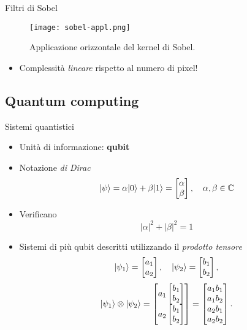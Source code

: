\begin{frame}{Filtri di Sobel}
	\begin{figure}
		\begin{center}
			\texttt{[image: sobel-appl.png]}
		\end{center}
		\caption{Applicazione orizzontale del kernel di Sobel.}\label{fig:sobel-appl}
	\end{figure}

	\begin{itemize}
		\item Complessità \emph{lineare} rispetto al numero di pixel!
	\end{itemize}
\end{frame}


\subsection{Quantum computing}

\begin{frame}{Sistemi quantistici}
	\begin{itemize}
		\item Unità  di informazione: \textbf{qubit}
		\item Notazione \emph{di Dirac}
		\[
		\lvert\psi\rangle = \alpha\lvert0\rangle + \beta\lvert1\rangle = \begin{bmatrix}
			\alpha\\\beta
		\end{bmatrix},\quad \alpha,\beta \in \mathbb{C}
		\]
		\item Verificano
		\[
		|\alpha|^2 + |\beta|^2 = 1
		\]
		\pause
		\item Sistemi di più qubit descritti utilizzando il \emph{prodotto tensore}
		\[
		\lvert\psi_1\rangle = \begin{bmatrix} a_1 \\ a_2 \end{bmatrix}, \quad \lvert\psi_2\rangle = \begin{bmatrix} b_1 \\ b_2 \end{bmatrix},
			\]
			\[
			\lvert\psi_1\rangle \otimes \lvert\psi_2\rangle
			= \begin{bmatrix}
				a_1 \begin{bmatrix} b_1 \\ b_2 \end{bmatrix} \\
					a_2 \begin{bmatrix} b_1 \\ b_2 \end{bmatrix}
			\end{bmatrix} =
			\begin{bmatrix}
				a_1 b_1 \\ a_1 b_2 \\ a_2 b_1 \\ a_2 b_2
			\end{bmatrix}.
			\]
	\end{itemize}
\end{frame}


